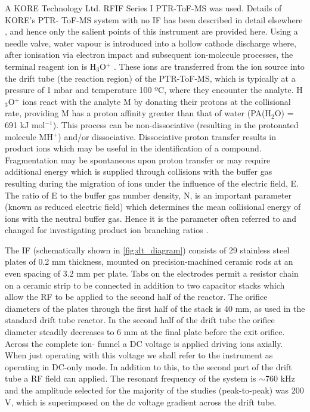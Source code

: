 A KORE Technology Ltd. RFIF Series I PTR-ToF-MS was used. Details of KORE’s PTR- ToF-MS system with no IF has been described in detail elsewhere \cite{blake2004demonstration,ENNIS200572,RN445}, and hence only the salient points of this instrument are provided here. Using a needle valve, water vapour is introduced into a hollow cathode discharge where, after ionisation via electron impact and subsequent ion-molecule processes, the terminal reagent ion is H$_3$O$^+$ \cite{ellis2013proton}. These ions are transferred from the ion source into the drift tube (the reaction region) of the PTR-ToF-MS, which is typically at a pressure of 1 mbar and temperature 100 ºC, where they encounter the analyte. H$_3$O$^+$ ions react with the analyte M by donating their protons at the collisional rate, providing M has a proton affinity greater than that of water (PA(H$_2$O) = 691 kJ mol$^{-1}$). This process can be non-dissociative (resulting in the protonated molecule MH$^+$) and/or dissociative. Dissociative proton transfer results in product ions which may be useful in the identification of a compound. Fragmentation may be spontaneous upon proton transfer or may require additional energy which is supplied through collisions with the buffer gas resulting during the migration of ions under the influence of the electric field, E. The ratio of E to the buffer gas number density, N, is an important parameter (known as reduced electric field) which determines the mean collisional energy of ions with the neutral buffer gas. Hence it is the parameter often referred to and changed for investigating product ion branching ratios \cite{brown2010proton,sulzer2012proton,doi:10.1002/jms.2993,kassebacher2013investigations,sulzer2013applications,agarwal2014sensitivity,acton2014headspace,lanza2015selective}.

The IF (schematically shown in \autoref{fig:dt_diagram}) consists of 29 stainless steel plates of 0.2 mm thickness, mounted on precision-machined ceramic rods at an even spacing of 3.2 mm per plate. Tabs on the electrodes permit a resistor chain on a ceramic strip to be connected in addition to two capacitor stacks which allow the RF to be applied to the second half of the reactor. The orifice diameters of the plates through the first half of the stack is 40 mm, as used in the standard drift tube reactor. In the second half of the drift tube the orifice diameter steadily decreases to 6 mm at the final plate before the exit orifice. Across the complete ion- funnel a DC voltage is applied driving ions axially. When just operating with this voltage we shall refer to the instrument as operating in DC-only mode. In addition to this, to the second part of the drift tube a RF field can applied. The resonant frequency of the system is $\sim$760 kHz and the amplitude selected for the majority of the studies (peak-to-peak) was 200 V, which is superimposed on the dc voltage gradient across the drift tube. 

